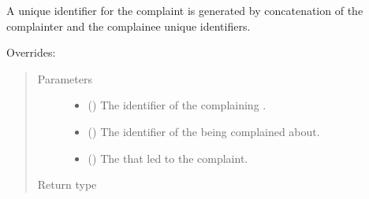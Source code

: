 \documentclass[letterpaper,10pt,english]{sphinxmanual}
\begin{document}
\begin{fulllineitems}
\begin{fulllineitems}
A unique identifier for the complaint is generated by concatenation
of the complainter and the complainee unique identifiers.
\begin{description}
\item[{Overrides:}] \leavevmode
{\hyperref[\detokenize{app.domain:app.domain.cluster_groups.Cluster.complain}]{}}

\end{description}
\begin{quote}\begin{description}
\item[{Parameters}] \leavevmode\begin{itemize}
\item {} 
 () \textendash{} The identifier of the complaining
{\hyperref[\detokenize{app.domain:app.domain.network_nodes.SGNodeExt}]{}}.

\item {} 
 () \textendash{} The identifier of the
{\hyperref[\detokenize{app.domain:app.domain.network_nodes.SGNodeExt}]{}}
being complained about.

\item {} 
 ({\hyperref[\detokenize{app:app.type_hints.HttpResponse}]{}}) \textendash{} The {\hyperref[\detokenize{app.domain.helpers:app.domain.helpers.enums.HttpCodes}]{}}
that led to the complaint.

\end{itemize}

\item[{Return type}] \leavevmode
{}

\end{description}\end{quote}

\end{fulllineitems}


\end{fulllineitems}
\end{document}
